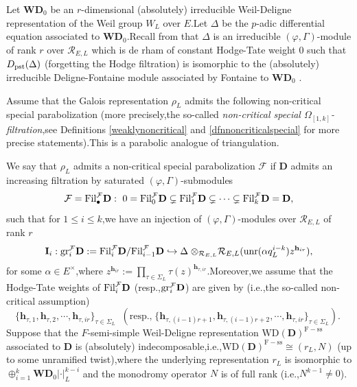 \documentclass[SecEq,CM,GP]{degruyter-crelle} %
\theoremstyle{plain}
\newcommand{\Dpik}{{\mathbf{D}}}
\newcommand{\fil}{{\rm Fil}}
\newcommand{\gr}{{\rm gr}}
\newcommand{\hpi}{{{\mathbf{h}}}}
\newcommand{\omepik}{\Omega_{[1,k]}}
\newcommand{\pst}{{\rm pst}}
\newcommand{\tee}{{{\otimes}_{\cR_{E,L}}}}
\newcommand{\unr}{{\rm unr}}
\newcommand{\wdre}{{\textbf{WD}}}
\newcommand{\cR}{\mathcal R}
\newcommand{\cF}{\mathcal F}
\begin{document}
Let $\wdre_0$ be an $r$-dimensional (absolutely) irreducible Weil-Deligne representation of the Weil group $W_L$ over $E$.\;Let $\Delta$ be the $p$-adic differential equation associated to $\wdre_0$.\;Recall from \cite{berger2008equations} that $\Delta$ is an irreducible $(\varphi,\Gamma)$-module of rank $r$ over $\cR_{E,L}$ which is de rham of constant Hodge-Tate weight $0$ such that $D_{\pst}(\Delta)$ (forgetting the Hodge filtration) is isomorphic to the (absolutely) irreducible Deligne-Fontaine module  associated by Fontaine to  $\wdre_0$ \cite[Proposition 4.1]{breuil2007first}.

Assume that the Galois representation $\rho_L$ admits the following non-critical special parabolization (more precisely,\;the so-called \textit{non-critical special $\omepik$-filtration},\;see Definitions \ref{weaklynoncritical} and \ref{dfnnoncriticalspecial} for more precise statements).\;This is a parabolic analogue of triangulation.\;

We say that $\rho_L$ admits a non-critical special parabolization $\cF$ if $\Dpik$ admits an increasing filtration by saturated $(\varphi,\Gamma)$-submodules
\[\cF=\fil_{\bullet}^{\cF} \Dpik: \ 0 =\fil_0^{\cF} \Dpik \subsetneq \fil_1^{\cF}\Dpik \subsetneq \cdots \subsetneq \fil_{k}^{\cF} \Dpik=\Dpik,\]
such that for $1\leq i\leq k$,\;we have an injection of $(\varphi,\Gamma)$-modules over $\cR_{E,L}$ of rank $r$
\begin{equation}\label{introDpikinjection}
	\mathbf{I}_i:\gr_{i}^{\cF}\Dpik:=\fil_i^{\cF}\Dpik/\fil_{i-1}^{\cF}\Dpik \hookrightarrow {\Delta\;}\tee \cR_{E,L}(\unr(\alpha q_L^{i-k})z^{\hpi_{ir}}),
\end{equation}
for some $\alpha\in E^\times$,\;where $z^{\hpi_{ir}}:=\prod_{\tau\in  \Sigma_L}\tau(z)^{\hpi_{\tau,ir}}$.\;Moreover,\;we assume that  the Hodge-Tate weights of $\fil_i^{\cF} \Dpik$ (resp.,\;$\gr_i^{\cF} \Dpik$) are given by (i.e.,\;the so-called non-critical assumption) $$\{\hpi_{\tau,1},\hpi_{\tau,2},\cdots,\hpi_{\tau,ir}\}_{\tau\in \Sigma_L}\;\; (\text{resp.,}\;\{\hpi_{\tau,(i-1)r+1},\hpi_{\tau,(i-1)r+2},\cdots,\hpi_{\tau,ir}\}_{\tau\in \Sigma_L}).\;$$
Suppose that the $F$-semi-simple Weil-Deligne representation $\mathrm{WD}(\Dpik)^{\mathrm{F-ss}}$ associated to $\Dpik$ is (absolutely) indecomposable,\;i.e.,\;$\mathrm{WD}(\Dpik)^{\mathrm{F-ss}}\cong(r_L,N)$ (up to some unramified twist),\;where the underlying representation $r_L$ is isomorphic to $ \oplus_{i=1}^k\wdre_0|\cdot|_L^{k-i}$ and the monodromy operator $N$ is of full rank (i.e.,\;$N^{k-1}\neq 0$).\;
\end{document}

